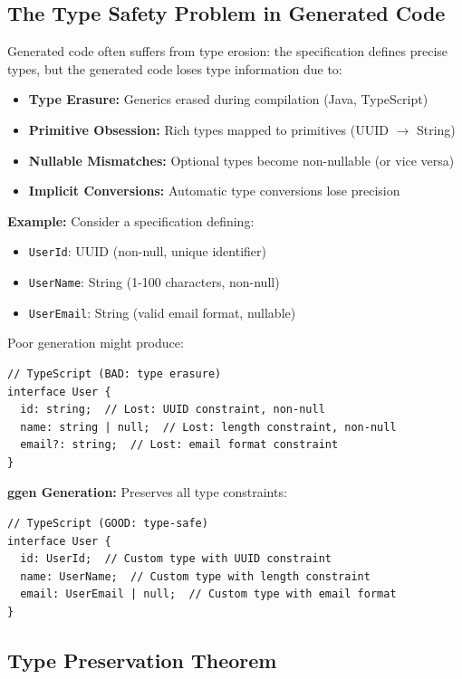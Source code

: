 \subsection{The Type Safety Problem in Generated Code}

Generated code often suffers from type erosion: the specification defines precise types, but the generated code loses type information due to:

\begin{itemize}
    \item \textbf{Type Erasure:} Generics erased during compilation (Java, TypeScript)
    \item \textbf{Primitive Obsession:} Rich types mapped to primitives (UUID $\rightarrow$ String)
    \item \textbf{Nullable Mismatches:} Optional types become non-nullable (or vice versa)
    \item \textbf{Implicit Conversions:} Automatic type conversions lose precision
\end{itemize}

\textbf{Example:} Consider a specification defining:
\begin{itemize}
    \item \texttt{UserId}: UUID (non-null, unique identifier)
    \item \texttt{UserName}: String (1-100 characters, non-null)
    \item \texttt{UserEmail}: String (valid email format, nullable)
\end{itemize}

Poor generation might produce:
\begin{verbatim}
// TypeScript (BAD: type erasure)
interface User {
  id: string;  // Lost: UUID constraint, non-null
  name: string | null;  // Lost: length constraint, non-null
  email?: string;  // Lost: email format constraint
}
\end{verbatim}

\textbf{ggen Generation:} Preserves all type constraints:
\begin{verbatim}
// TypeScript (GOOD: type-safe)
interface User {
  id: UserId;  // Custom type with UUID constraint
  name: UserName;  // Custom type with length constraint
  email: UserEmail | null;  // Custom type with email format
}
\end{verbatim}

\subsection{Type Preservation Theorem}

